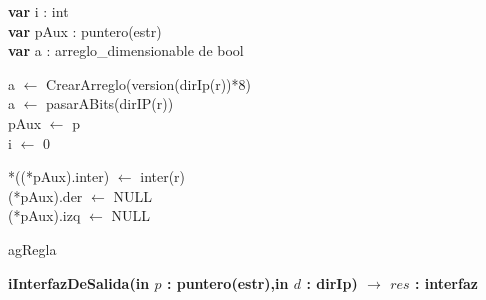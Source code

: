 	\begin{algorithm}[H]
	
	
\textbf{var} i : int\\
\textbf{var} pAux : puntero(estr) 	\\
\textbf{var} a : arreglo\_dimensionable de bool\\

\BlankLine 

a $\leftarrow$ CrearArreglo(version(dirIp(r))*8)\\

\BlankLine
{}
\BlankLine 
a $\leftarrow$ pasarABits(dirIP(r))\\
pAux $\leftarrow$ p\\
i $\leftarrow$ 0

\BlankLine 

\BlankLine 
{}
\BlankLine 
*((*pAux).inter) $\leftarrow$ inter(r)\\
(*pAux).der $\leftarrow$ NULL\\
(*pAux).izq $\leftarrow$ NULL

 \caption{agRegla}
   \end{algorithm}




\newpage


\textbf{iInterfazDeSalida(in $p$ : puntero(estr),in $d$ : dirIp)   $\longrightarrow$	$res$ : interfaz
}
    \incmargin{1em}
    \linesnumbered
    \dontprintsemicolon
    
